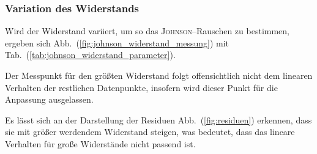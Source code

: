 \documentclass[sn-mathphys-num,iicol]{sn-jnl}
\theoremstyle{thmstyleone}
\theoremstyle{thmstyletwo}
\theoremstyle{thmstylethree}
\begin{document}
\subsubsection{Variation des Widerstands}
Wird der Widerstand variiert, um so das \textsc{Johnson}--Rauschen zu bestimmen, ergeben sich Abb.\ (\ref{fig:johnson_widerstand_messung}) mit Tab.\ (\ref{tab:johnson_widerstand_parameter}).

Der Messpunkt für den größten Widerstand folgt offensichtlich nicht dem linearen Verhalten der restlichen Datenpunkte, insofern wird dieser Punkt für die Anpassung ausgelassen.

Es lässt sich an der Darstellung der Residuen Abb.\ (\ref{fig:residuen}) erkennen, dass sie mit größer werdendem Widerstand steigen, was bedeutet, dass das lineare Verhalten für große Widerstände nicht passend ist.
\end{document}
